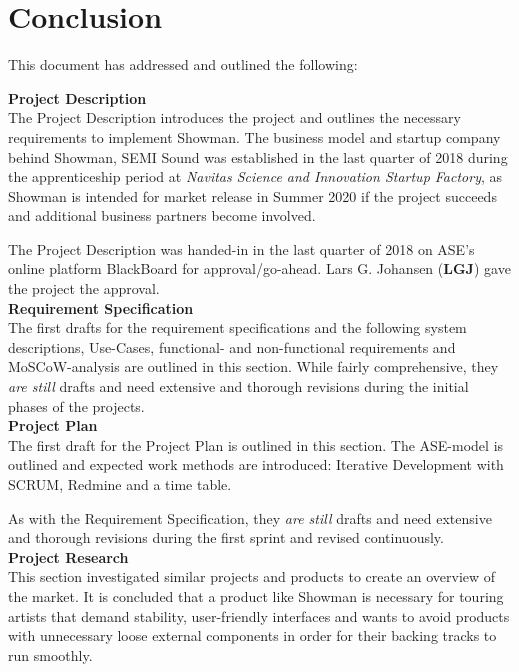 \chapter{Conclusion}
This document has addressed and outlined the following:

\textbf{Project Description} \\
The Project Description introduces the project and outlines the necessary requirements to implement Showman. The business model and startup company behind Showman, SEMI Sound was established in the last quarter of 2018 during the apprenticeship period at \textit{Navitas Science and Innovation Startup Factory}, as Showman is intended for market release in Summer 2020 if the project succeeds and additional business partners become involved. \newline

The Project Description was handed-in in the last quarter of 2018 on ASE's online platform BlackBoard for approval/go-ahead. Lars G. Johansen (\textbf{LGJ}) gave the project the approval. \\

\textbf{Requirement Specification} \\
The first drafts for the requirement specifications and the following system descriptions, Use-Cases, functional- and non-functional requirements and MoSCoW-analysis are outlined in this section. While fairly comprehensive, they \textit{are still} drafts and need extensive and thorough revisions during the initial phases of the projects. \\

\textbf{Project Plan} \\
The first draft for the Project Plan is outlined in this section. The ASE-model is outlined and expected work methods are introduced: Iterative Development with SCRUM, Redmine and a time table. \newline

As with the Requirement Specification, they \textit{are still} drafts and need extensive and thorough revisions during the first sprint and revised continuously. \\

\textbf{Project Research} \\
This section investigated similar projects and products to create an overview of the market. It is concluded that a product like Showman is necessary for touring artists that demand stability, user-friendly interfaces and wants to avoid products with unnecessary loose external components in order for their backing tracks to run smoothly. \\

